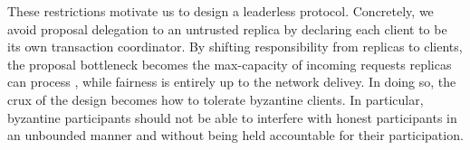These restrictions motivate us to design a leaderless protocol. Concretely, we avoid proposal delegation to an untrusted replica by declaring each client to be its own transaction coordinator.
By shifting responsibility from replicas to clients, the proposal bottleneck becomes the max-capacity of incoming requests replicas can process , while fairness is entirely up to the network delivey. In doing so, the crux of the design becomes how to tolerate byzantine clients. In particular, byzantine participants should not be able to interfere with honest participants in an unbounded manner and without being held accountable for their participation. 



